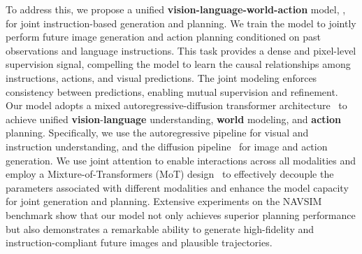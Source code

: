 To address this, we propose a unified \textbf{vision-language-world-action} model, \model, for joint instruction-based generation and planning.
We train the model to jointly perform future image generation and action planning  conditioned on past observations and language instructions. 
This task provides a dense and pixel-level supervision signal, compelling the model to learn the causal relationships among instructions, actions, and visual predictions. 
The joint modeling enforces consistency between predictions, enabling mutual supervision and refinement. 
Our model adopts a mixed autoregressive-diffusion transformer architecture~\cite{MoT, janusflow, llamafusion, bagel} to achieve unified \textbf{vision}-\textbf{language} understanding, \textbf{world} modeling, and \textbf{action} planning. 
Specifically, we use the autoregressive pipeline for visual and instruction understanding, and the diffusion pipeline~\cite{rectified-flow, flow-matching} for image and action generation.
We use joint attention to enable interactions across all modalities and employ a Mixture-of-Transformers (MoT) design~\cite{MoT} to effectively decouple the parameters associated with different modalities and enhance the model capacity for joint generation and planning. 
Extensive experiments on the NAVSIM~\cite{navsim-v1, navsim-v2} benchmark show that our model not only achieves superior planning performance but also demonstrates a remarkable ability to generate high-fidelity and instruction-compliant future images and plausible trajectories.
